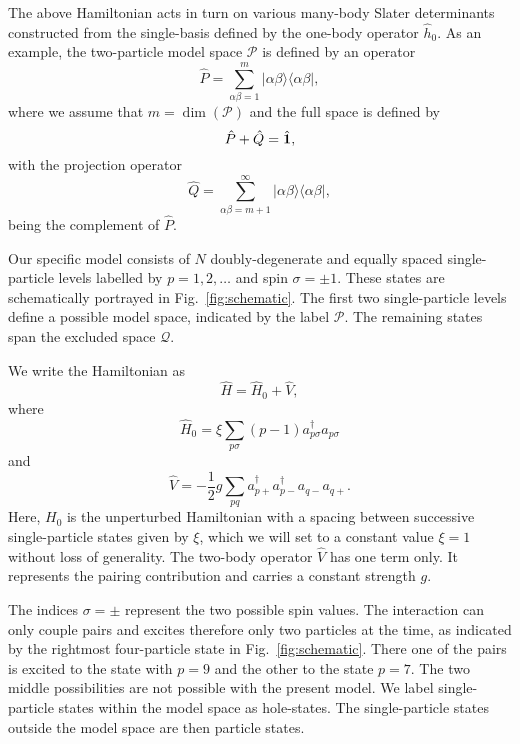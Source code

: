 \documentclass{article}
\begin{document}
The above Hamiltonian acts in turn on various many-body Slater determinants constructed from the single-basis defined by the one-body operator $\hat{h}_0$.
As an example, the two-particle model space $\mathcal{P}$ is defined by an operator
\begin{equation*}
    \hat{P} = \sum_{\alpha\beta =1}^{m} \lvert \alpha\beta \rangle \langle \alpha\beta \rvert,
\end{equation*}
where we assume that $m = \dim(\mathcal{P})$ and the full space is defined by
\begin{equation*}
    \hat{P}+\hat{Q}=\hat{{\bf 1}},
\end{equation*}
with the projection operator
\begin{equation*}
    \hat{Q} = \sum_{\alpha\beta =m+1}^{\infty} \lvert \alpha\beta \rangle \langle \alpha\beta \rvert,
\end{equation*}
being the complement of $\hat{P}$.

Our specific model consists of $N$ doubly-degenerate and equally spaced single-particle levels labelled by $p = 1, 2, \ldots$ and spin $\sigma = \pm 1$.
These states are schematically portrayed in Fig.~\ref{fig:schematic}.
The first two single-particle levels define a possible model space, indicated by the label $\mathcal{P}$.
The remaining states span the excluded space $\mathcal{Q}$.

We write the Hamiltonian as
\begin{equation*}
    \hat{H} = \hat{H}_0 + \hat{V},
\end{equation*}
where
\begin{equation*}
    \hat{H}_0 = \xi \sum_{p\sigma}(p - 1) a_{p\sigma}^{\dagger} a_{p\sigma}
\end{equation*}
and
\begin{equation*}
    \hat{V} = -\frac{1}{2} g \sum_{pq} a^{\dagger}_{p+} a^{\dagger}_{p-} a_{q-} a_{q+}.
\end{equation*}
Here, $H_0$ is the unperturbed Hamiltonian with a spacing between successive single-particle states given by $\xi$, which we will set to a constant value $\xi=1$ without loss of generality.
The two-body operator $\hat{V}$ has one term only.
It represents the pairing contribution and carries a constant strength $g$.

The indices $\sigma = \pm$ represent the two possible spin values.
The interaction can only couple pairs and excites therefore only two particles at the time, as indicated by the rightmost four-particle state in Fig.~\ref{fig:schematic}.
There one of the pairs is excited to the state with $p = 9$ and the other to the state $p = 7$.
The two middle possibilities are not possible with the present model.
We label single-particle states within the model space as hole-states.
The single-particle states outside the model space are then particle states.
\end{document}
